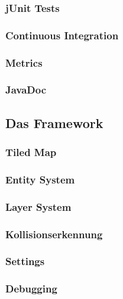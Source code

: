 		\subsubsection{jUnit Tests}					\label{sec:U3}		\clearpage
		\subsubsection{Continuous Integration}		\label{sec:U4}		\clearpage
		\subsubsection{Metrics}						\label{sec:U5}		\clearpage
		\subsubsection{JavaDoc}						\label{sec:U6}		\clearpage
	\subsection{Das Framework}                      \label{sec:F0}		
		\subsubsection{Tiled Map}					\label{sec:F1}		\clearpage
		\subsubsection{Entity System}				\label{sec:F2}		\clearpage
		\subsubsection{Layer System}				\label{sec:F3}		\clearpage
		\subsubsection{Kollisionserkennung}			\label{sec:F4}		\clearpage
		\subsubsection{Settings}					\label{sec:F5}		\clearpage
		\subsubsection{Debugging}					\label{sec:F6}		\clearpage
